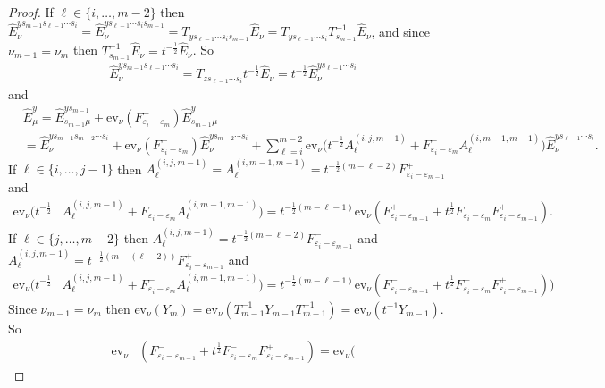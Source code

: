 \documentclass[11pt]{article}
\theoremstyle{plain}
\theoremstyle{definition}
\theoremstyle{remark}
\numberwithin{equation}{section}
\def\ev{\mathrm{ev}}
\newcounter{r}
\newcounter{s}
\begin{document}
\begin{proof}
If $\ell\in \{i, \ldots, m-2\}$ then
$\widehat{E}_\nu^{ys_{m-1}s_{\ell-1}\cdots s_i} 
= \widehat{E}_\nu^{ys_{\ell-1}\cdots s_is_{m-1}}
= T_{ys_{\ell-1}\cdots s_is_{m-1}} \widehat{E}_\nu
= T_{ys_{\ell-1}\cdots s_i}T_{s_{m-1}}^{-1}\widehat{E}_\nu$,
and since $\nu_{m-1}=\nu_m$ then $T_{s_{m-1}}^{-1}\widehat{E}_\nu = t^{-\frac12}\widehat{E}_\nu$. 
So
\begin{align*}
\widehat{E}_\nu^{ys_{m-1}s_{\ell-1}\cdots s_i} 
= T_{zs_{\ell-1}\cdots s_i}t^{-\frac12}\widehat{E}_\nu
= t^{-\frac12}\widehat{E}_\nu^{ys_{\ell-1}\cdots s_i}
\end{align*}
and
\begin{align*}
&\widehat{E}^y_\mu
= \widehat{E}^{ys_{m-1}}_{s_{m-1}\mu} 
+ \ev_\nu(F^-_{\varepsilon_i-\varepsilon_m})\widehat{E}^y_{s_{m-1}\mu} \\
&= \widehat{E}_\nu^{ys_{m-1}s_{m-2}\cdots s_i}  +\ev_\nu(F^-_{\varepsilon_i-\varepsilon_m}) \widehat{E}_\nu^{ys_{m-2}\cdots s_i} 
+\sum_{\ell=i}^{m-2} 
\ev_\nu\big(t^{-\frac12}A_\ell^{(i,j,m-1)} +F^-_{\varepsilon_i-\varepsilon_m} A_\ell^{(i,m-1,m-1)} \big)
\widehat{E}_\nu^{ys_{\ell-1}\cdots s_i}.
\end{align*}
If $\ell\in \{i, \ldots, j-1\}$ then $A_\ell^{(i,j,m-1)} = A_\ell^{(i,m-1,m-1)}
= t^{-\frac12(m-\ell-2)} F^+_{\varepsilon_i-\varepsilon_{m-1}}$
and
\begin{align*}
\ev_\nu(t^{-\frac12}&A_\ell^{(i,j,m-1)} +F^-_{\varepsilon_i-\varepsilon_m} A_\ell^{(i,m-1,m-1)})
= t^{-\frac12(m-\ell-1)} \ev_\nu(
F^+_{\varepsilon_i-\varepsilon_{m-1}} + t^{\frac12} F^-_{\varepsilon_i-\varepsilon_m} F^+_{\varepsilon_i-\varepsilon_{m-1}} ).
\end{align*}
If $\ell\in \{j, \ldots, m-2\}$ then $A_\ell^{(i,j,m-1)} =t^{-\frac12(m-\ell-2)} F^-_{\varepsilon_i-\varepsilon_{m-1}}$ and
$A_\ell^{(i,j,m-1)} =t^{-\frac12(m-(\ell-2) ) } F^+_{\varepsilon_i-\varepsilon_{m-1}}$
and
\begin{align*}
\ev_\nu(t^{-\frac12}&A_\ell^{(i,j,m-1)} +F^-_{\varepsilon_i-\varepsilon_m} A_\ell^{(i,m-1,m-1)})
= t^{-\frac12(m-\ell-1)} \ev_\nu(F^-_{\varepsilon_i-\varepsilon_{m-1}}
+t^{\frac12}F^-_{\varepsilon_i-\varepsilon_m} F^+_{\varepsilon_i-\varepsilon_{m-1}}))
\end{align*}
Since $\nu_{m-1}=\nu_m$ then $\ev_\nu(Y_m) 
= \ev_\nu(T_{m-1}^{-1}Y_{m-1}T_{m-1}^{-1}) = \ev_\nu(t^{-1}Y_{m-1})$. So
\begin{align*}
\ev_\nu&(F^-_{\varepsilon_i-\varepsilon_{m-1}}
+t^{\frac12}F^-_{\varepsilon_i-\varepsilon_m}F^+_{\varepsilon_i - \varepsilon_{m-1}}) 
= \ev_\nu\Big(

\end{align*}
\end{proof}
\end{document}
